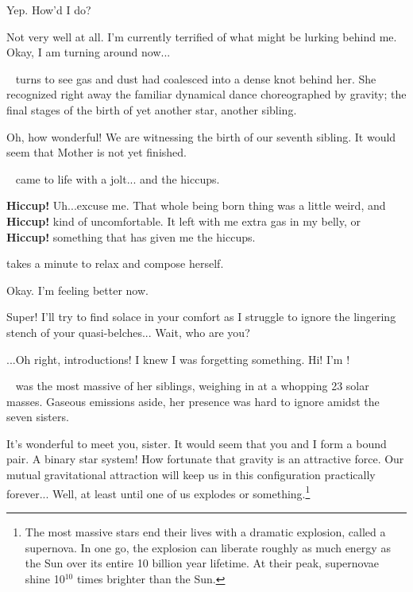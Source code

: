 \documentclass[main.tex]{subfiles}
\begin{document}
\par \Electra Yep.  How'd I do?

\par \Maia Not very well at all.  I'm currently terrified of what might be lurking behind me.  Okay, I am turning around now...

\par \nar \rmmaia~ turns to see gas and dust had coalesced into a dense knot behind her.  She recognized right away the familiar dynamical dance choreographed by gravity; the final stages of the birth of yet another star, another sibling.

\par \Maia Oh, how wonderful!  We are witnessing the birth of our seventh sibling.  It would seem that Mother is not yet finished.

\par \nar \rmmerope~ came to life with a jolt... and the hiccups.

\par \Merope \textbf{Hiccup!}  Uh...excuse me.  That whole being born thing was a little weird, and \textbf{Hiccup!} kind of uncomfortable.  It left with me extra gas in my belly, or \textbf{Hiccup!} something that has given me the hiccups.  

\par \nar \rmmerope takes a minute to relax and compose herself.

\par \Merope Okay.  I'm feeling better now.  

\par \Sterope Super!  I'll try to find solace in your comfort as I struggle to ignore the lingering stench of your quasi-belches...  Wait, who are you?

\par \Merope ...Oh right, introductions! I knew I was forgetting something.   Hi!  I'm \rmmerope!

\par \rmmerope~ was the most massive of her siblings, weighing in at a whopping 23 solar masses.  Gaseous emissions aside, her presence was hard to ignore amidst the seven sisters.  

\par \Maia It's wonderful to meet you, sister.  It would seem that you and I form a bound pair.  A binary star system!  How fortunate that gravity is an attractive force.  Our mutual gravitational attraction will keep us in this configuration practically forever... Well, at least until one of us explodes or something.\footnote{The most massive stars end their lives with a dramatic explosion, called a supernova.  In one go, the explosion can liberate roughly as much energy as the Sun over its entire 10 billion year lifetime.  At their peak, supernovae shine 10$^{10}$ times brighter than the Sun.}
\end{document}
